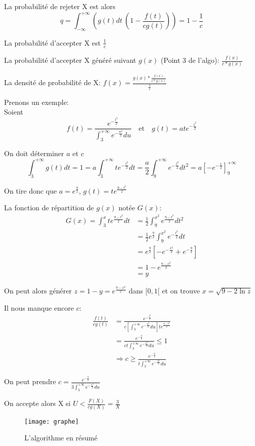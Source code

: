La probabilité de rejeter X est alors
\[q=\int_{-\infty}^{+\infty} (g(t)dt\ (1-\frac{f(t)}{cg(t)}))=1-\frac{1}{c}\]

La probabilité d'accepter X est $\frac{1}{c}$

La probabilité d'accepter X généré suivant $g(x)$ (Point 3 de l'algo): $\frac{f(x)}{c*g(x)}$

La densité de probabilité de X: $f(x)=\frac{g(x)*\frac{f(x)}{c*g(x)}}{\frac{1}{c}}$

Prenons un exemple:\\
Soient
\[
f(t)=\frac{e^{-\frac{t^2}{2}}}{\int_3^{+\infty} e^{-\frac{u^2}{2}}du} \quad \text{et} \quad g(t)=a t e^{-\frac{t^2}{2}}
\]

On doit déterminer $a$ et $c$
\[
\int_3^{+\infty}g(t)dt=1=a\int_3^{+\infty}te^{-\frac{t^2}{2}}dt=\frac{a}{2}\int_9^{+\infty}e^{-\frac{t^2}{2}}dt^2=a\left [-e^{-\frac{x}{2}}\right ]_9^{+\infty}
\]

On tire donc que $a=e^{\frac{9}{2}}$, $g(t)=te^{\frac{9-t^2}{2}}$

La fonction de répartition de $g(x)$ notée $G(x)$:
\begin{align*}
G(x)=\int_3^xte^{\frac{9-t^2}{2}}dt &= \frac{1}{2}\int_9^{x^2}e^{\frac{9-t^2}{2}}dt^2\\
&= \frac{1}{2}e^{\frac{9}{2}}\int_9^{x^2}e^{-\frac{t^2}{2}}dt\\
&= e^{\frac{9}{2}}\left [-e^{-\frac{x^2}{2}}+e^{-\frac{9}{2}}\right ]\\
&= 1-e^{\frac{9-x^2}{2}}\\
&= y
\end{align*}

On peut alors générer $z=1-y=e^{\frac{9-x^2}{2}}$ dans $[0,1[$ et on trouve $x=\sqrt{9-2\ln{z}}$

Il nous manque encore $c$:
\begin{align*}
\frac{f(t)}{cg(t)} &=\frac{e^{-\frac{t^2}{2}}}{c\left [ \int_3^{+\infty} e^{-\frac{u^2}{2}}du\right ]te^{\frac{9-t^2}{2}}} \\
&=\frac{e^{-\frac{9}{2}}}{ct\int_3^{+\infty}e^{-\frac{u^2}{2}}du} \leq 1\\
&\Rightarrow c \geq \frac{e^{-\frac{9}{2}}}{t\int_3^{+\infty}e^{-\frac{u^2}{2}}du}
\end{align*}

On peut prendre $c=\frac{e^{-\frac{9}{2}}}{3\int_3^{+\infty}e^{-\frac{u^2}{2}}du}$

On accepte alors X si $U<\frac{F(X)}{cg(X)}=\frac{3}{X}$
\vspace{0.3cm}

\begin{figure}[h]
	\centering
  \texttt{[image: graphe]}
	\caption{L'algorithme en résumé}
\end{figure}